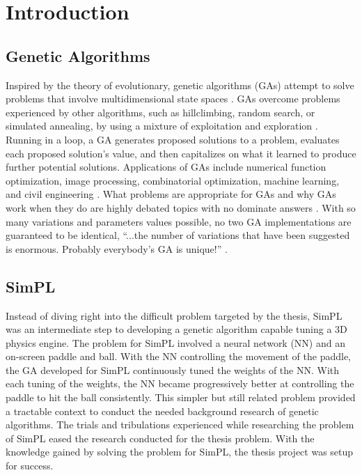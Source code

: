 \chapter{Introduction}

\label{Chapter1}


\section{Genetic Algorithms}

Inspired by the theory of evolutionary, genetic algorithms (GAs) attempt to solve problems that involve multidimensional state spaces \cite{ColinReeves}\cite{Beasley93anoverview}. GAs overcome problems experienced by other algorithms, such as hillclimbing, random search, or simulated annealing, by using a mixture of exploitation and exploration \cite{Beasley93anoverview}. Running in a loop, a GA generates proposed solutions to a problem, evaluates each proposed solution's value, and then capitalizes on what it learned to produce further potential solutions. Applications of GAs include numerical function optimization, image processing, combinatorial optimization, machine learning, and civil engineering \cite{Beasley93anoverview}. What problems are appropriate for GAs and why GAs work when they do are highly debated topics with no dominate answers \cite{ColinReeves}. With so many variations and parameters values possible, no two GA implementations are guaranteed to be identical, ``...the number of variations that have been suggested is enormous. Probably everybody's GA is unique!'' \cite{ColinReeves}.   

\section{SimPL}

Instead of diving right into the difficult problem targeted by the thesis, SimPL was an intermediate step to developing a genetic algorithm capable tuning a 3D physics engine. The problem for SimPL involved a neural network (NN) and an on-screen paddle and ball. With the NN controlling the movement of the paddle, the GA developed for SimPL continuously tuned the weights of the NN. With each tuning of the weights, the NN became progressively better at controlling the paddle to hit the ball consistently. This simpler but still related problem provided a tractable context to conduct the needed background research of genetic algorithms. The trials and tribulations experienced while researching the problem of SimPL eased the research conducted for the thesis problem. With the knowledge gained by solving the problem for SimPL, the thesis project was setup for success.    

